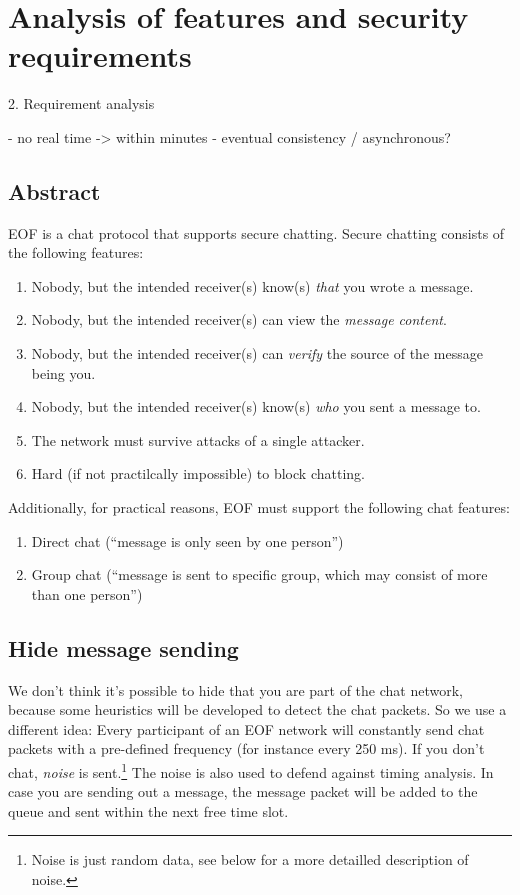 \chapter{Analysis of features and security requirements}

2. Requirement analysis

- no real time -> within minutes
    - eventual consistency / asynchronous?

\section{Abstract}
EOF is a chat protocol that supports secure chatting.
Secure chatting consists of the following features:
\begin{enumerate}
\item Nobody, but the intended receiver(s) know(s) \emph{that} you wrote a message.
\item Nobody, but the intended receiver(s) can view the \emph{message content}.
\item Nobody, but the intended receiver(s) can \emph{verify} the source of the message being you.
\item Nobody, but the intended receiver(s) know(s) \emph{who} you sent a message to.
\item The network must survive attacks of a single attacker.
\item Hard (if not practilcally impossible) to block chatting.
\end{enumerate}
Additionally, for practical reasons, EOF must support the following
chat features:
\begin{enumerate}
\item Direct chat ("`message is only seen by one person"')
\item Group chat ("`message is sent to specific group, which may consist of
more than one person"')
\end{enumerate}
\section{Hide message sending}
We don't think it's possible to hide that you are part of the chat network,
because some heuristics will be developed to detect the chat packets.
So we use a different idea:
Every participant of an EOF network will constantly send chat packets
with a pre-defined frequency (for instance every 250 ms).
If you don't chat, \emph{noise} is sent.\footnote{Noise is just random
data, see below for a more detailled description of noise.}
The noise is also used to defend against timing analysis.
In case you are sending out a message, the message packet will be added to the
queue and sent within the next free time slot.

